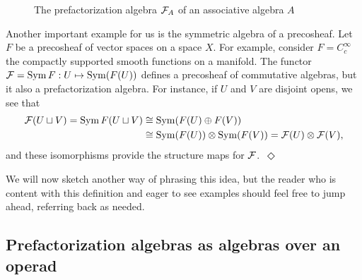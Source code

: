 \documentclass[11pt]{amsart}
\begin{document}
\begin{figure}
\begin{center}
\end{center}
\caption{The prefactorization algebra $\mathcal F_A$ of an associative algebra $A$}
\label{fig:assasfact}
\end{figure}

\begin{eg}\label{ex:SymOfCosheaf}
Another important example for us is the symmetric algebra of a precosheaf. 
Let $F$ be a precosheaf of vector spaces on a space $X$. 
For example, consider $F = C^\infty_c$ the compactly supported smooth functions on a manifold. The functor $\mathcal F  = \operatorname{Sym} F: U \mapsto \operatorname{Sym}(F(U))$ defines a precosheaf of commutative algebras, but it also a prefactorization algebra. For instance, if $U$ and $V$ are disjoint opens, we see that
\begin{align*}
\mathcal F(U \sqcup V) = \operatorname{Sym} F(U \sqcup V) & \cong \operatorname{Sym} (F(U) \oplus F(V)) \\ & \cong \operatorname{Sym}(F(U)) \otimes \operatorname{Sym}(F(V)) = \mathcal F(U) \otimes \mathcal F(V),
\end{align*}
and these isomorphisms provide the structure maps for $\mathcal F$.~\hfill$\Diamond$
\end{eg}

We will now sketch another way of phrasing this idea, but the reader who is content with this definition and eager to see examples should feel free to jump ahead, referring back as needed.

\subsection{Prefactorization algebras as algebras over an operad}
\label{sec:disj}
\end{document}
